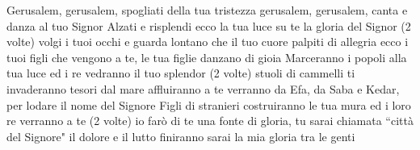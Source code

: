 \beginchorus
Gerusalem, gerusalem,
spogliati della tua tristezza
gerusalem, gerusalem,
canta e danza al tuo Signor
\endchorus
\beginverse
Alzati e risplendi ecco la tua luce
su te la gloria del Signor (2 volte)
volgi i tuoi occhi e guarda lontano
che il tuo cuore palpiti di allegria
ecco i tuoi figli che vengono a te,
le tua figlie danzano di gioia
Marceranno i popoli alla tua luce
ed i re vedranno il tuo splendor (2 volte)
stuoli di cammelli ti invaderanno
tesori dal mare affluiranno a te
verranno da Efa, da Saba e Kedar,
per lodare il nome del Signore
Figli di stranieri costruiranno le tua mura
ed i loro re verranno a te (2 volte)
io farò di te una fonte di gloria,
tu sarai chiamata “città del Signore"
il dolore e il lutto finiranno
sarai la mia gloria tra le genti
\endverse
\endsong
